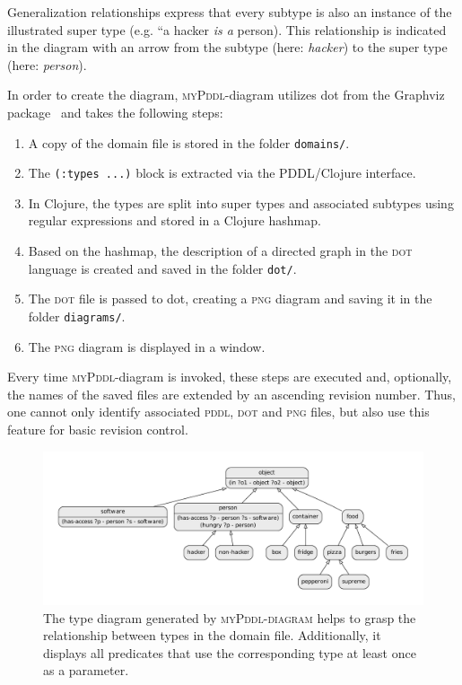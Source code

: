 \documentclass[runningheads]{llncs}
\newcommand{\mypddl}{\textsc{myPddl}\xspace}
\newcommand{\mypddldiagram}{\textsc{myPddl-diagram}\xspace}
\newcommand{\pddl}{\textsc{pddl}\xspace}
\begin{document}
\begin{description}
Generalization relationships express that every subtype is also an
instance of the illustrated super type (e.g. ``a hacker \emph{is a}
person). This relationship is indicated in the diagram with an
arrow from the subtype (here: \emph{hacker}) to the super type (here:
\emph{person}).

In order to create the diagram, \mypddl-diagram utilizes dot from the
Graphviz package~\cite{ellson2002graphviz} and takes the following
steps:

\begin{enumerate}
  \setlength\itemsep{0.5em}
\item A copy of the domain file is stored in the folder
  \texttt{domains/}.
\item The \texttt{(:types~...)} block is extracted via the PDDL/Clojure
  interface.
\item In Clojure, the types are split into super types and associated
  subtypes using regular expressions and stored in a Clojure hashmap.
\item Based on the hashmap, the description of a directed graph in the
  \textsc{dot} language is created and saved in the folder
  \texttt{dot/}.
\item The \textsc{dot} file is passed to dot, creating a \textsc{png}
  diagram and saving it in the folder
  \texttt{diagrams/}.
\item The \textsc{png} diagram is displayed in a window.
\end{enumerate}

Every time \mypddl-diagram is invoked, these steps are executed and,
optionally, the names of the saved files are extended by an ascending
revision number. Thus, one cannot only identify associated \pddl,
\textsc{dot} and \textsc{png} files, but also use this feature for
basic revision control.

  \begin{figure}
    \centering
    \includegraphics[width=1\textwidth]{dot-diagram}
    \caption{The type diagram generated by \mypddldiagram helps to
      grasp the relationship between types in the domain
      file. Additionally, it displays all predicates that use the
      corresponding type at least once as a parameter.}
    \label{fig:diagram}
  \end{figure}


\end{description}
\end{document}
